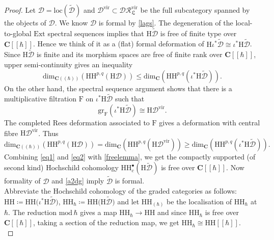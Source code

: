 \documentclass{article}
\theoremstyle{plain}
\theoremstyle{definition}
\theoremstyle{remark}
\newcommand{\mr}{\mathrm}
\newcommand{\C}{\mathbf C}
\newcommand{\brak}{[\![\hbar]\!]}
\newcommand{\cbrak}{(\!(\hbar)\!)}
\newcommand{\3}{\vspace{3mm}}
\newcommand{\2}{\vspace{2mm}}
\newcommand{\1}{\vspace{1mm}}
\begin{document}
\begin{proof}
Let $\mathcal{D}=\mr{loc}\left(\widetilde{\mathcal{D}}\right)$ and $\mathcal{D}^\mr{vir}\subset \mathcal{DR}^{\mr{vir}}_\mathfrak{L}$ be the full subcategory spanned by the objects of $\mathcal{D}$. We know $\mathcal{D}$ is formal by \cref{lags}. The degeneration of the local-to-global $\mr{Ext}$ spectral sequences implies that $\mr{H}\widetilde{\mathcal{D}}$ is free of finite type over $\C\brak$. Hence we think of it as a (flat) formal deformation of $\mr{H}\iota^*\widetilde{\mathcal{D}}\cong \iota^*\mr{H}\widetilde{\mathcal{D}}$. Since $\mr{H}\widetilde{\mathcal{D}}$ is finite and its morphism spaces are free of finite rank over $\C\brak$, upper semi-continuity gives an inequality \begin{equation}\label{eq1}\mr{dim}_{\C\cbrak}\left(\mr{HH}^{p,q}\left(\mr{H}\mathcal{D}\right)\right)\le \mr{dim}_{\C}\left(\mr{HH}^{p,q}\left(\iota^*\mr{H}\widetilde{\mathcal{D}}\right)\right).\end{equation} On the other hand, the spectral sequence argument shows that there is a multiplicative filtration $\mr{F}$ on $\iota^*\mr{H}\widetilde{\mathcal{D}}$ such that $$\mr{gr}_\mr{F}\left(\iota^*\mr{H}\widetilde{\mathcal{D}}\right) \cong  \mr{H}\mathcal{D}^\mr{vir}.$$ The completed Rees deformation associated to $\mr{F}$ gives a deformation with central fibre $\mr{H}\mathcal{D}^{\mr{vir}}$. Thus
\begin{equation}\label{eq2}\mr{dim}_{\C\cbrak}\left(\mr{HH}^{p,q}\left(\mr{H}\mathcal{D}\right)\right)=\mr{dim}_{\C}\left(\mr{HH}^{p,q}\left(\mr{H}\mathcal{D}^\mr{vir}\right)\right)\ge \mr{dim}_{\C}\left(\mr{HH}^{p,q}\left(\iota^*\mr{H}\widetilde{\mathcal{D}}\right)\right).\end{equation}
Combining \eqref{eq1} and \eqref{eq2} with \cref{freelemma}, we get the compactly supported (of second kind) Hochschild cohomology $\mr{HH}_c^\bullet\left(\mr{H}\widetilde{\mathcal{D}}\right)$ is free over $\C\brak$. Now formality of $\mathcal{D}$ and \cref{a2dg} imply $\widetilde{\mathcal{D}}$ is formal.\\
Abbreviate the Hochschild cohomology of the graded categories as follows: $\mr{HH} \coloneqq \mr{HH}\big(\iota^*\mr{H}\widetilde{\mathcal{D}}\big)$, $\mr{HH}_{\hbar} \coloneqq \mr{HH}\big(\mr{H}\widetilde{\mathcal{D}}\big)$ and let $\mr{HH}_{(\hbar)}$ be the localisation of $\mr{HH}_\hbar$ at $\hbar$. The reduction $\mr{mod}\,\hbar$ gives a map $\mr{HH}_{\hbar} \to \mr{HH}$ and since $\mr{HH}_\hbar$ is free over $\C\brak$, taking a section of the reduction map, we get $\mr{HH}_\hbar \cong \mr{HH}\brak$.\\

\end{proof}
\end{document}
